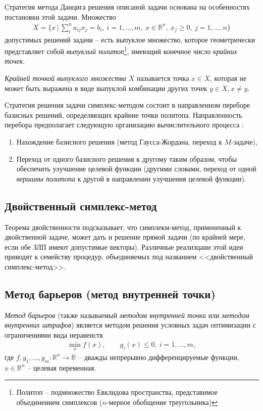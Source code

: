 \documentclass[%
	11pt,
	a4paper,
	utf8,
		]{article}
\begin{document}
Стратегия метода Данцига решения описаной задачи основана на особенностях постановки этой задачи. Множество
\begin{align*}
	X = \{ x \, | \, \sum_{i}^{n} a_{ij} x_j = b_i, \ i = 1, \ldots, m, \ x \in \mathbb{R}^n, \ x_j \geqslant 0, \ j = 1, \ldots, n \}
\end{align*}
допустимых решений задачи -- есть выпуклое множество, которое геометрически представляет собой \emph{выпуклый политоп}\footnote{Политоп -- подмножество Евклидова пространства, представимое объединением симплексов ($ n $-мерное обобщение треугольника)}, имеющий конечное число \emph{крайних точек}.

\emph{Крайней точкой выпуклого множества} $ X $ называется точка $ x \in X $, которая не может быть выражена в виде выпуклой комбинации других точек $ y \in X, x \neq y $.

Стратегия решения задачи симплекс-методом состоит в направленном переборе базисных решений, определяющих крайние точки политопа. Направленность перебора предполагает следующую организацию вычислительного процесса \cite{panteleev}:
\begin{enumerate}
	\item Нахождение базисного решения (метод Гаусса-Жордана, переход к $ M $-задаче),
	
	\item Переход от одного базисного решения к другому таким образом, чтобы обеспечить улучшение целевой функции (другими словами, переход от одной \emph{вершины политопа} к другой в направлении улучшения целевой функции).
\end{enumerate}

\subsection{Двойственный симплекс-метод}

Теорема двойственности подсказывает, что симплекм-метод, примененный к двойственной задаче, может дать и решение прямой задачи (по крайней мере, если обе ЗЛП имеют допустимые векторы). Различные реализцаии этой идеи приводят к семейству процедур, объединяемых под названием <<двойственный симплекс-метод>>. 

\subsection{Метод барьеров (метод внутренней точки)}

\emph{Метод барьеров} (также называемый \emph{методом внутренней точки} или \emph{методом внутренних штрафов}) является методом решения условных задач оптимизации с ограничениями вида неравенств
\begin{align*}
	\min\limits_x f(x), \qquad g_i(x) \leqslant 0, \ i = 1, \ldots, m,
\end{align*}
где $ f, g_1, \ldots, g_m:\mathbb{R}^n \rightarrow \mathbb{R} $ -- дважды непрерывно дифференцируемые функции, $ x \in \mathbb{R}^n $ -- целевая переменная.
\end{document}
